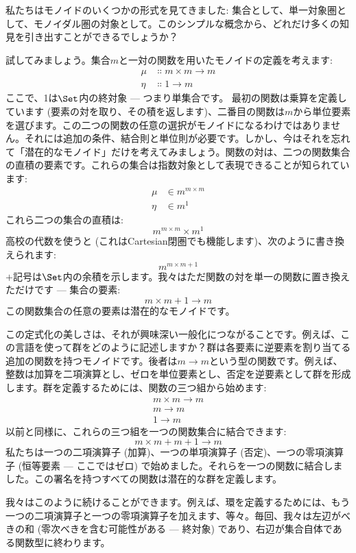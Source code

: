 
\lettrine[lhang=0.17]{私}{たち}はモノイドのいくつかの形式を見てきました: 集合として、単一対象圏として、モノイダル圏の対象として。このシンプルな概念から、どれだけ多くの知見を引き出すことができるでしょうか？

試してみましょう。集合$m$と一対の関数を用いたモノイドの定義を考えます: 
\begin{align*}
  \mu  & \Colon m\times{}m \to m \\
  \eta & \Colon 1 \to m
\end{align*}
ここで、1は$\Set$内の終対象 --- つまり単集合です。
最初の関数は乗算を定義しています (要素の対を取り、その積を返します)、二番目の関数は$m$から単位要素を選びます。この二つの関数の任意の選択がモノイドになるわけではありません。それには追加の条件、結合則と単位則が必要です。しかし、今はそれを忘れて「潜在的なモノイド」だけを考えてみましょう。関数の対は、二つの関数集合の直積の要素です。これらの集合は指数対象として表現できることが知られています: 
\begin{align*}
  \mu  & \in m^{m\times{}m} \\
  \eta & \in m^1
\end{align*}
これら二つの集合の直積は: 
\[m^{m\times{}m}\times{}m^1\]
高校の代数を使うと (これはCartesian閉圏でも機能します)、次のように書き換えられます: 
\[m^{m\times{}m + 1}\]
$+$記号は$\Set$内の余積を示します。我々はただ関数の対を単一の関数に置き換えただけです --- 集合の要素: 
\[m\times{}m + 1 \to m\]
この関数集合の任意の要素は潜在的なモノイドです。

この定式化の美しさは、それが興味深い一般化につながることです。例えば、この言語を使って群をどのように記述しますか？群は各要素に逆要素を割り当てる追加の関数を持つモノイドです。後者は$m \to m$という型の関数です。例えば、整数は加算を二項演算とし、ゼロを単位要素とし、否定を逆要素として群を形成します。群を定義するためには、関数の三つ組から始めます: 
\begin{align*}
  m\times{}m \to m \\
  m \to m          \\
  1 \to m
\end{align*}
以前と同様に、これらの三つ組を一つの関数集合に結合できます: 
\[m\times{}m + m + 1 \to m\]
私たちは一つの二項演算子 (加算)、一つの単項演算子 (否定)、一つの零項演算子 (恒等要素 --- ここではゼロ) で始めました。それらを一つの関数に結合しました。この署名を持つすべての関数は潜在的な群を定義します。

我々はこのように続けることができます。例えば、環を定義するためには、もう一つの二項演算子と一つの零項演算子を加えます、等々。毎回、我々は左辺がべきの和 (零次べきを含む可能性がある --- 終対象) であり、右辺が集合自体である関数型に終わります。

